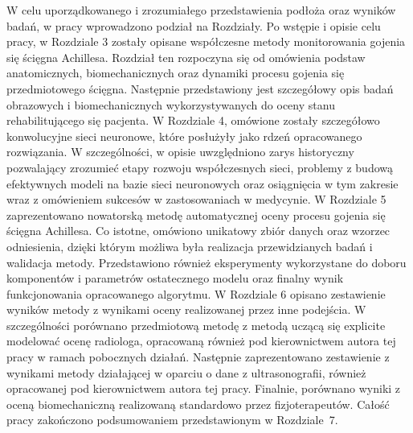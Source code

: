 W celu uporządkowanego i zrozumiałego przedstawienia podłoża oraz wyników badań, w pracy wprowadzono podział na Rozdziały. Po wstępie i opisie celu pracy, w Rozdziale 3 zostały opisane współczesne metody monitorowania gojenia się ścięgna Achillesa. Rozdział ten rozpoczyna się od omówienia podstaw anatomicznych, biomechanicznych oraz dynamiki procesu gojenia się przedmiotowego ścięgna. Następnie przedstawiony jest szczegółowy opis badań obrazowych i biomechanicznych wykorzystywanych do oceny stanu rehabilitującego się pacjenta. W Rozdziale 4, omówione zostały szczegółowo konwolucyjne sieci neuronowe, które posłużyły jako rdzeń opracowanego rozwiązania. W szczególności, w opisie uwzględniono zarys historyczny pozwalający zrozumieć etapy rozwoju współczesnych sieci, problemy z budową efektywnych modeli na bazie sieci neuronowych oraz osiągnięcia w tym zakresie wraz z omówieniem sukcesów w zastosowaniach w medycynie. W Rozdziale 5 zaprezentowano nowatorską metodę automatycznej oceny procesu gojenia się ścięgna Achillesa. Co istotne, omówiono unikatowy zbiór danych oraz wzorzec odniesienia, dzięki którym możliwa była realizacja przewidzianych badań i walidacja metody. Przedstawiono również eksperymenty wykorzystane do doboru komponentów i parametrów ostatecznego modelu oraz finalny wynik funkcjonowania opracowanego algorytmu. W Rozdziale 6 opisano zestawienie wyników metody z wynikami oceny realizowanej przez inne podejścia. W szczególności porównano przedmiotową metodę z metodą uczącą się explicite modelować ocenę radiologa, opracowaną również pod kierownictwem autora tej pracy w ramach pobocznych działań. Następnie zaprezentowano zestawienie z wynikami metody działającej w oparciu o dane \linebreak z ultrasonografii, również opracowanej pod kierownictwem autora tej pracy. Finalnie, porównano wyniki z oceną biomechaniczną realizowaną standardowo przez fizjoterapeutów. Całość pracy zakończono podsumowaniem przedstawionym w Rozdziale~7.   



